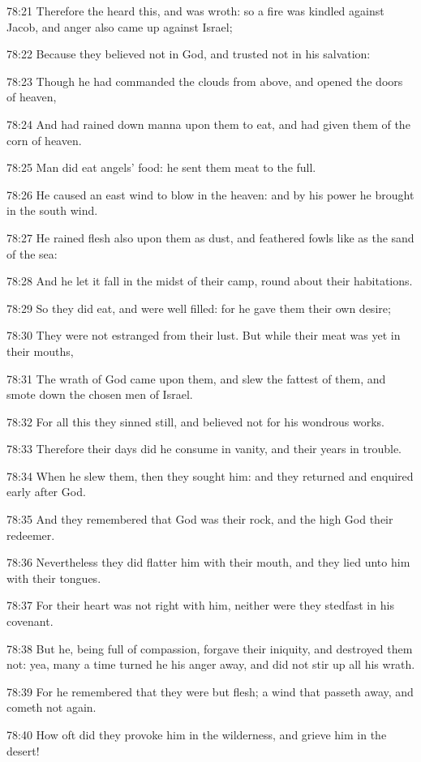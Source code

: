 78:21 Therefore the \LORD heard this, and was wroth: so a fire was
kindled against Jacob, and anger also came up against Israel;

78:22 Because they believed not in God, and trusted not in his
salvation:

78:23 Though he had commanded the clouds from above, and opened the
doors of heaven,

78:24 And had rained down manna upon them to eat, and had given them
of the corn of heaven.

78:25 Man did eat angels' food: he sent them meat to the full.

78:26 He caused an east wind to blow in the heaven: and by his power
he brought in the south wind.

78:27 He rained flesh also upon them as dust, and feathered fowls like
as the sand of the sea:

78:28 And he let it fall in the midst of their camp, round about their
habitations.

78:29 So they did eat, and were well filled: for he gave them their
own desire;

78:30 They were not estranged from their lust. But while their meat
was yet in their mouths,

78:31 The wrath of God came upon them, and slew the fattest of them,
and smote down the chosen men of Israel.

78:32 For all this they sinned still, and believed not for his
wondrous works.

78:33 Therefore their days did he consume in vanity, and their years
in trouble.

78:34 When he slew them, then they sought him: and they returned and
enquired early after God.

78:35 And they remembered that God was their rock, and the high God
their redeemer.

78:36 Nevertheless they did flatter him with their mouth, and they
lied unto him with their tongues.

78:37 For their heart was not right with him, neither were they
stedfast in his covenant.

78:38 But he, being full of compassion, forgave their iniquity, and
destroyed them not: yea, many a time turned he his anger away, and did
not stir up all his wrath.

78:39 For he remembered that they were but flesh; a wind that passeth
away, and cometh not again.

78:40 How oft did they provoke him in the wilderness, and grieve him
in the desert!

